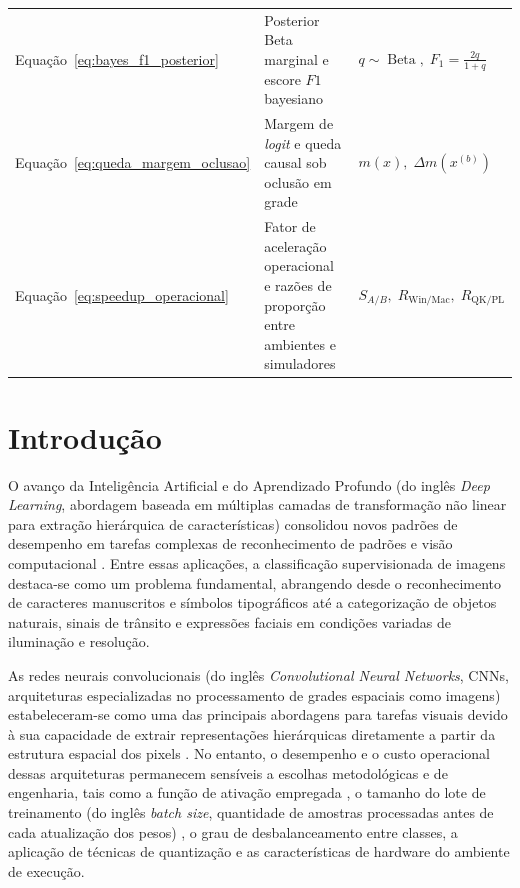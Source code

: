 \documentclass[
    12pt,
    openright,
    oneside,
    a4paper,
    english,
    brazil
]{abntex2}
\begin{document}
\begin{longtable}{@{}p{2.9cm}p{7.8cm}p{\dimexpr\textwidth-10.7cm-4\tabcolsep\relax}@{}}
Equação~\eqref{eq:bayes_f1_posterior} & Posterior Beta marginal e escore \(F1\) bayesiano & \(q \sim \operatorname{Beta},\; F_1 = \frac{2q}{1+q}\) \\
Equação~\eqref{eq:queda_margem_oclusao} & Margem de \textit{logit} e queda causal sob oclusão em grade & \(m(x),\; \Delta m(x^{(b)})\) \\
Equação~\eqref{eq:speedup_operacional} & Fator de aceleração operacional e razões de proporção entre ambientes e simuladores & \(S_{A/B},\; R_{\text{Win/Mac}},\; R_{\text{QK/PL}}\) \\
\end{longtable}
\addtocounter{table}{-1}
\cleardoublepage

\tableofcontents*
\cleardoublepage

\textual



\chapter{Introdução}

O avanço da Inteligência Artificial e do Aprendizado Profundo (do inglês \textit{Deep Learning}, abordagem baseada em múltiplas camadas de transformação não linear para extração hierárquica de características) consolidou novos padrões de desempenho em tarefas complexas de reconhecimento de padrões e visão computacional \cite{LeCun2015,goodfellow2016deep,szeliski2022computer}. Entre essas aplicações, a classificação supervisionada de imagens destaca-se como um problema fundamental, abrangendo desde o reconhecimento de caracteres manuscritos e símbolos tipográficos até a categorização de objetos naturais, sinais de trânsito e expressões faciais em condições variadas de iluminação e resolução.

As redes neurais convolucionais (do inglês \textit{Convolutional Neural Networks}, CNNs, arquiteturas especializadas no processamento de grades espaciais como imagens) estabeleceram-se como uma das principais abordagens para tarefas visuais devido à sua capacidade de extrair representações hierárquicas diretamente a partir da estrutura espacial dos pixels \cite{LeCun2015,goodfellow2016deep}. No entanto, o desempenho e o custo operacional dessas arquiteturas permanecem sensíveis a escolhas metodológicas e de engenharia, tais como a função de ativação empregada \cite{nair2010relu,he2015prelu}, o tamanho do lote de treinamento (do inglês \textit{batch size}, quantidade de amostras processadas antes de cada atualização dos pesos) \cite{goodfellow2016deep}, o grau de desbalanceamento entre classes, a aplicação de técnicas de quantização e as características de hardware do ambiente de execução.
\end{document}
